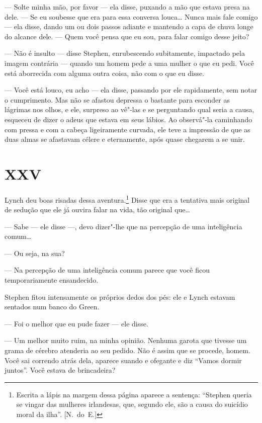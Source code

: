 --- Solte minha mão, por favor --- ela disse, puxando a mão que estava presa na
dele.  --- Se eu soubesse que era para essa conversa louca\ldots{}  Nunca mais fale
comigo --- ela disse, dando um ou dois passos adiante e mantendo a capa de
chuva longe do alcance dele.  --- Quem você pensa que eu sou, para falar comigo
desse jeito?

--- Não é insulto --- disse Stephen, enrubescendo subitamente, impactado pela
imagem contrária --- quando um homem pede a uma mulher o que eu pedi.  Você
está aborrecida com alguma outra coisa, não com o que eu disse.

--- Você está louco, eu acho --- ela disse, passando por ele rapidamente, sem
notar o cumprimento.  Mas não se afastou depressa o bastante para esconder as
lágrimas nos olhos, e ele, surpreso ao vê"-las e se perguntando qual seria a
causa, esqueceu de dizer o adeus que estava em seus lábios.  Ao observá"-la
caminhando com pressa e com a cabeça ligeiramente curvada, ele teve a impressão
de que as duas almas se afastavam célere e eternamente, após quase chegarem a
se unir.

\section*{XXV}

Lynch deu boas risadas dessa aventura.\footnote{ Escrita a lápis na
margem dessa página aparece a sentença: “Stephen queria se vingar das
mulheres irlandesas, que, segundo ele, são a causa do suicídio moral da
ilha”. [N.~do~E.]}  Disse que era a tentativa mais original de sedução
que ele já ouvira falar na vida, tão original que\ldots{}

--- Sabe --- ele disse ---, devo dizer"-lhe que na percepção de uma
inteligência comum\ldots{}

--- Ou seja, na sua?

--- Na percepção de uma inteligência comum parece que você ficou
temporariamente ensandecido.

Stephen fitou intensamente os próprios dedos dos pés: ele e Lynch
estavam sentados num banco do Green.

--- Foi o melhor que eu pude fazer --- ele disse.

--- Um melhor muito ruim, na minha opinião.  Nenhuma garota que
tivesse um grama de cérebro atenderia ao seu pedido.  Não é assim que
se procede, homem.  Você sai correndo atrás dela, aparece suando e
ofegante e diz “Vamos dormir juntos”.  Você estava de brincadeira?


